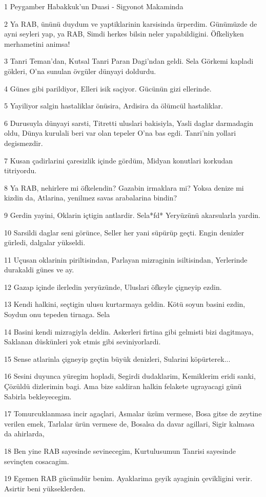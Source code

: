 \par 1 Peygamber Habakkuk'un Duasi - Sigyonot Makaminda
\par 2 Ya RAB, ününü duydum ve yaptiklarinin karsisinda ürperdim. Günümüzde de ayni seyleri yap, ya RAB, Simdi herkes bilsin neler yapabildigini. Öfkeliyken merhametini animsa!
\par 3 Tanri Teman'dan, Kutsal Tanri Paran Dagi'ndan geldi. Sela Görkemi kapladi gökleri, O'na sunulan övgüler dünyayi doldurdu.
\par 4 Günes gibi parildiyor, Elleri isik saçiyor. Gücünün gizi ellerinde.
\par 5 Yayiliyor salgin hastaliklar önüsira, Ardisira da ölümcül hastaliklar.
\par 6 Durusuyla dünyayi sarsti, Titretti uluslari bakisiyla, Yasli daglar darmadagin oldu, Dünya kurulali beri var olan tepeler O'na bas egdi. Tanri'nin yollari degismezdir.
\par 7 Kusan çadirlarini çaresizlik içinde gördüm, Midyan konutlari korkudan titriyordu.
\par 8 Ya RAB, nehirlere mi öfkelendin? Gazabin irmaklara mi? Yoksa denize mi kizdin da, Atlarina, yenilmez savas arabalarina bindin?
\par 9 Gerdin yayini, Oklarin içtigin antlardir. Sela*fd* Yeryüzünü akarsularla yardin.
\par 10 Sarsildi daglar seni görünce, Seller her yani süpürüp geçti. Engin denizler gürledi, dalgalar yükseldi.
\par 11 Uçusan oklarinin piriltisindan, Parlayan mizraginin isiltisindan, Yerlerinde durakaldi günes ve ay.
\par 12 Gazap içinde ilerledin yeryüzünde, Uluslari öfkeyle çigneyip ezdin.
\par 13 Kendi halkini, seçtigin ulusu kurtarmaya geldin. Kötü soyun basini ezdin, Soydun onu tepeden tirnaga. Sela
\par 14 Basini kendi mizragiyla deldin. Askerleri firtina gibi gelmisti bizi dagitmaya, Saklanan düskünleri yok etmis gibi seviniyorlardi.
\par 15 Sense atlarinla çigneyip geçtin büyük denizleri, Sularini köpürterek...
\par 16 Sesini duyunca yüregim hopladi, Segirdi dudaklarim, Kemiklerim eridi sanki, Çözüldü dizlerimin bagi. Ama bize saldiran halkin felakete ugrayacagi günü Sabirla bekleyecegim.
\par 17 Tomurcuklanmasa incir agaçlari, Asmalar üzüm vermese, Bosa gitse de zeytine verilen emek, Tarlalar ürün vermese de, Bosalsa da davar agillari, Sigir kalmasa da ahirlarda,
\par 18 Ben yine RAB sayesinde sevinecegim, Kurtulusumun Tanrisi sayesinde sevinçten cosacagim.
\par 19 Egemen RAB gücümdür benim. Ayaklarima geyik ayaginin çevikligini verir. Asirtir beni yükseklerden.


